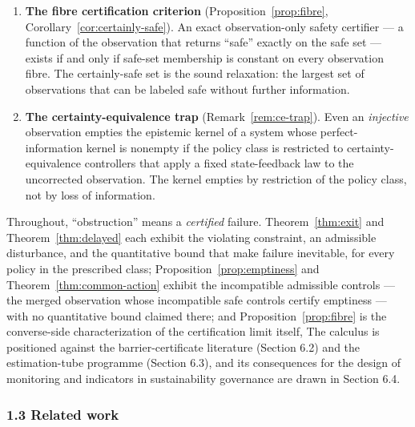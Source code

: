 \documentclass[11pt]{article}
\theoremstyle{definition}
\begin{document}
\begin{enumerate}
  information may be accurate but arrive too late.
\item
  \textbf{The fibre certification criterion} (Proposition~\ref{prop:fibre}, Corollary~\ref{cor:certainly-safe}).
  An exact observation-only safety certifier --- a function of the
  observation that returns ``safe'' exactly on the safe set --- exists
  if and only if safe-set membership is constant on every observation
  fibre. The certainly-safe set is the sound relaxation: the largest set
  of observations that can be labeled safe without further information.
\item
  \textbf{The certainty-equivalence trap} (Remark~\ref{rem:ce-trap}). Even an
  \emph{injective} observation empties the epistemic kernel of a system
  whose perfect-information kernel is nonempty if the policy class is
  restricted to certainty-equivalence controllers that apply a fixed
  state-feedback law to the uncorrected observation. The kernel empties
  by restriction of the policy class, not by loss of information.
\end{enumerate}

Throughout, ``obstruction'' means a \emph{certified} failure. Theorem~\ref{thm:exit} and Theorem~\ref{thm:delayed} each exhibit the violating constraint, an admissible disturbance,
and the quantitative bound that make failure inevitable, for every policy in the prescribed class; Proposition~\ref{prop:emptiness} and Theorem~\ref{thm:common-action} exhibit the incompatible
admissible controls --- the merged observation whose incompatible safe
controls certify emptiness --- with no quantitative bound claimed there;
and Proposition~\ref{prop:fibre} is the converse-side characterization of the certification
limit itself,  The calculus is positioned against
the barrier-certificate literature (Section 6.2) and the estimation-tube
programme (Section 6.3), and its consequences for the design of
monitoring and indicators in sustainability governance are drawn in
Section 6.4.

\subsubsection{1.3 Related work}\label{related-work}
\end{document}
